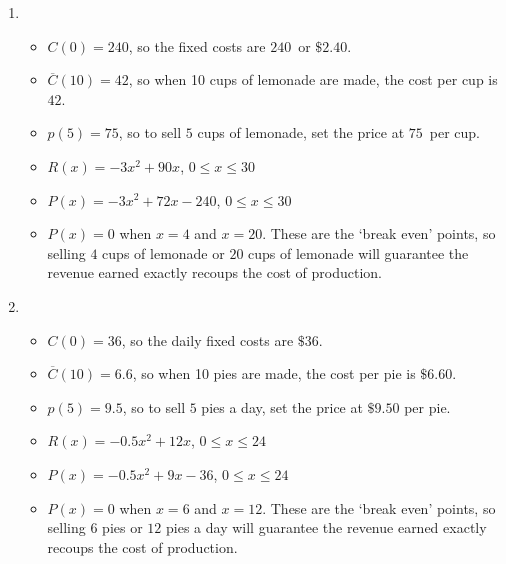 \documentclass{ximera}
\begin{document}
\begin{enumerate}
\item \begin{itemize}

\item  $C(0) = 240$, so the fixed costs are $240$\textcent \,  or $\$2.40$.

\item  $\overline{C}(10) = 42$, so when 10 cups of lemonade are made, the cost per cup is $42$\textcent.

\item  $p(5) = 75$, so to sell $5$ cups of lemonade, set the price at $75$\textcent \,  per cup.

\item $R(x) = -3x^2+90x$, $0 \leq x \leq 30$

\item  $P(x) = -3x^2+72x-240$, $0 \leq x \leq 30$

\item  $P(x) = 0$ when $x = 4$ and $x=20$.  These are the `break even' points, so selling $4$ cups of lemonade or $20$ cups of lemonade will guarantee the revenue earned exactly recoups the cost of production.

\end{itemize}

\pagebreak

\item  \begin{itemize}

\item  $C(0) = 36$, so the daily fixed costs are $\$36$.

\item  $\overline{C}(10) = 6.6$, so when 10 pies are made, the cost per pie is $\$6.60$.

\item  $p(5) = 9.5$, so to sell $5$ pies a day, set the price at $\$9.50$  per pie.

\item $R(x) = -0.5 x^2 + 12x$, $0 \leq x \leq 24$

\item  $P(x) = -0.5 x^2+9x-36$, $0 \leq x \leq 24$

\item  $P(x) = 0$ when $x = 6$ and $x=12$.  These are the `break even' points, so selling $6$ pies or $12$ pies a day will guarantee the revenue earned exactly recoups the cost of production.

\end{itemize}




\end{enumerate}
\end{document}
